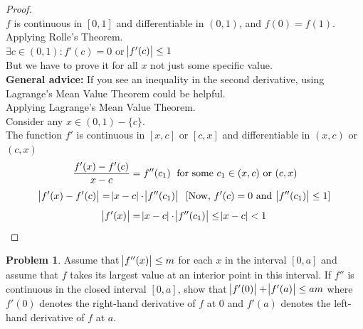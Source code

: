 \documentclass[14]{article}
\theoremstyle{definition}
\newtheorem{prob}{Problem}
\begin{document}
\begin{proof} $\text{}$\\
$f$ is continuous in $[0, 1]$ and differentiable in $(0, 1)$, and $f(0) = f(1)$. Applying Rolle's Theorem.\\
$\exists c \in (0, 1) : f'(c) = 0$ or $\abs{f'(c)} \leq 1$\\
But we have to prove it for all $x$ not just some specific value.\\
\textbf{General advice:} If you see an inequality in the second derivative, using Lagrange's Mean Value Theorem could be helpful.\\
Applying Lagrange's Mean Value Theorem.\\
Consider any $x \in (0, 1) - \{c\}$.\\
The function $f'$ is continuous in $[x, c]$ or $[c, x]$ and differentiable in $(x, c)$ or $(c, x)$
\[\dfrac{f'(x) - f'(c)}{x - c} = f''(c_1) \text{\; for some } c_1 \in (x, c) \text{ or } (c, x)\]
\[\abs{f'(x) - f'(c)} = \abs{x - c} \cdot \abs{f''(c_1)} \;\; [\text{Now, } f'(c) = 0 \text{ and } \abs{f''(c_1)} \leq 1 ]\]
\[\abs{f'(x)} = \abs{x - c} \cdot \abs{f''(c_1)} \leq \abs{x - c} < 1\]
\end{proof}
\pagebreak
\begin{prob}
Assume that $\abs{f''(x)} \leq m$ for each $x$ in the interval $[0, a]$ and assume that $f$ takes its largest value at an interior point in this interval. If $f''$ is continuous in the closed interval $[0, a]$, show that $\abs{f'(0)} + \abs{f'(a)}\leq am$ where $f'(0)$ denotes the right-hand derivative of $f$ at $0$ and $f'(a)$ denotes the left-hand derivative of $f$ at $a$.
\end{prob}
\end{document}
